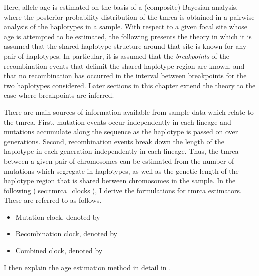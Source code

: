
Here, allele age is estimated on the basis of a (composite) Bayesian analysis, where the posterior probability distribution of the \gls{tmrca} is obtained in a pairwise analysis of the haplotypes in a sample.
With respect to a given focal site whose age is attempted to be estimated, the following presents the theory in which it is assumed that the shared haplotype structure around that site is known for any pair of haplotypes.
In particular, it is assumed that the \emph{breakpoints} of the recombination events that delimit the shared haplotype region are known, and that no recombination has occurred in the interval between breakpoints for the two haplotypes considered.
Later sections in this chapter extend the theory to the case where breakpoints are inferred.

There are  main sources of information available from sample data which relate to the \gls{tmrca}.
First, mutation events occur independently in each lineage and mutations accumulate along the sequence as the haplotype is passed on over generations.
Second, recombination events break down the length of the haplotype in each generation independently in each lineage.
Thus, the \gls{tmrca} between a given pair of chromosomes can be estimated from the number of mutations which segregate in  haplotypes, as well as the genetic length of the haplotype region that is shared between  chromosomes in the sample.
In the following (\cref{sec:tmrca_clocks}), I derive the formulations for  \gls{tmrca} estimators.
These are referred to as follows.
\begin{itemize}\singlespacing
  \item Mutation clock, denoted by \ClockM
  \item Recombination clock, denoted by \ClockR
	\item Combined clock, denoted by \ClockC
\end{itemize}
I then explain the age estimation method in detail in .

